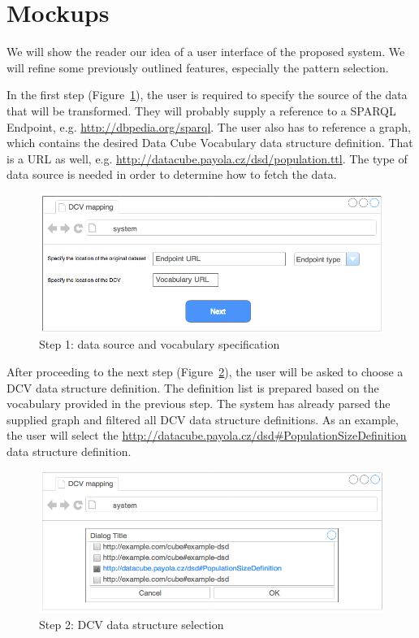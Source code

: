 \section{Mockups}
\FloatBarrier
We will show the reader our idea of a user interface of the proposed system. We 
will refine some previously outlined features, especially the pattern selection.

In the first step (Figure~\ref{fig:mockup-01}), the user is required to specify the source of the data that 
will be transformed. They will probably supply a reference to a SPARQL Endpoint,
e.g. \url{http://dbpedia.org/sparql}. The user also has to reference a graph, which contains the 
desired Data Cube Vocabulary data structure definition.
That is a URL as well, e.g. \url{http://datacube.payola.cz/dsd/population.ttl}.
The type of data source 
is needed in order to determine how to fetch the data.
\begin{figure}
	\centering
	\includegraphics[width=120mm]{img/mockup-01.png}
	\caption{Step 1: data source and vocabulary specification}
	\label{fig:mockup-01}
\end{figure}

After proceeding to the next step (Figure~\ref{fig:mockup-02}),
the user will be asked to choose a DCV data 
structure definition. The definition list is prepared based on the vocabulary provided 
in the previous step. The system has already parsed the supplied graph and filtered all
DCV data structure definitions. As an example, the user will select the
\url{http://datacube.payola.cz/dsd#PopulationSizeDefinition} data structure definition.

\begin{figure}
	\centering
	\includegraphics[width=120mm]{img/mockup-02.png}
	\caption{Step 2: DCV data structure selection}
	\label{fig:mockup-02}
\end{figure}

